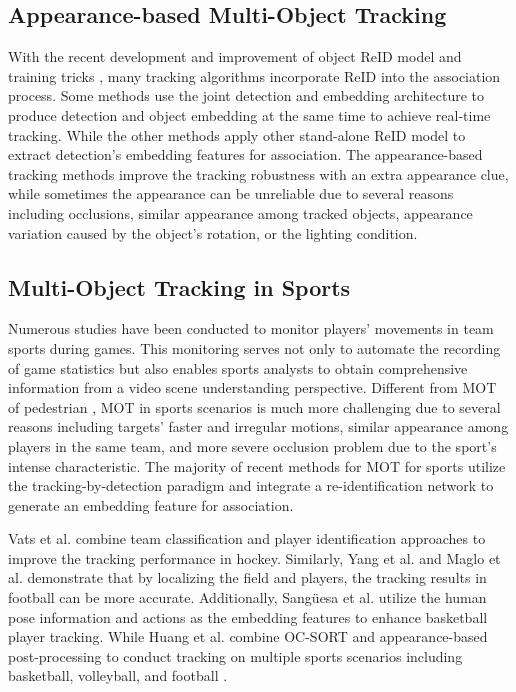 \documentclass[10pt,twocolumn,letterpaper]{article}
\begin{document}
\subsection{Appearance-based Multi-Object Tracking}
With the recent development and improvement of object ReID model \cite{OSNet} and training tricks \cite{luo2019bag}, many tracking algorithms incorporate ReID into the association process. Some methods use the joint detection and embedding architecture \cite{zhang2021fairmot,wang2020towards} to produce detection and object embedding at the same time to achieve real-time tracking. While the other methods \cite{DeepSORT,aharon2022bot} apply other stand-alone ReID model to extract detection's embedding features for association. The appearance-based tracking methods improve the tracking robustness with an extra appearance clue, while sometimes the appearance can be unreliable due to several reasons including occlusions, similar appearance among tracked objects, appearance variation caused by the object's rotation, or the lighting condition.

\subsection{Multi-Object Tracking in Sports}
Numerous studies have been conducted to monitor players' movements in team sports during games. This monitoring serves not only to automate the recording of game statistics but also enables sports analysts to obtain comprehensive information from a video scene understanding perspective. Different from MOT of pedestrian \cite{mot16}, MOT in sports scenarios is much more challenging due to several reasons including targets' faster and irregular motions, similar appearance among players in the same team, and more severe occlusion problem due to the sport's intense characteristic. The majority of recent methods for MOT for sports utilize the tracking-by-detection paradigm and integrate a re-identification network to generate an embedding feature for association.

Vats et al. \cite{hockey_ex_1} combine team classification and player identification approaches to improve the tracking performance in hockey. Similarly, Yang et al. \cite{soccer_ex_1} and Maglo et al. \cite{soccer_ex_3} demonstrate that by localizing the field and players, the tracking results in football can be more accurate. Additionally, Sang{\"{u}}esa et al. \cite{basketball_ex_1} utilize the human pose information and actions as the embedding features to enhance basketball player tracking. While Huang et al. \cite{huang2023observation} combine OC-SORT \cite{OCSORT} and appearance-based post-processing to conduct tracking on multiple sports scenarios including basketball, volleyball, and football \cite{cui2023sportsmot}.
\end{document}
